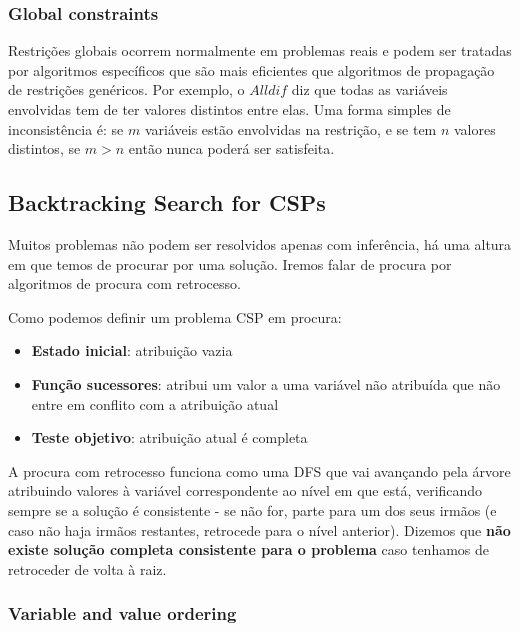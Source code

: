 \documentclass[11pt]{article}
\begin{document}
\subsubsection{Global constraints}

Restrições globais ocorrem normalmente em problemas reais e podem ser tratadas por algoritmos específicos que são mais eficientes que algoritmos de propagação de restrições genéricos. Por exemplo, o $Alldif$ diz que todas as variáveis envolvidas tem de ter valores distintos entre elas. Uma forma simples de inconsistência é: se $m$ variáveis estão envolvidas na restrição, e se tem $n$ valores distintos, se $m > n$ então nunca poderá ser satisfeita.

\subsection{Backtracking Search for CSPs}

Muitos problemas não podem ser resolvidos apenas com inferência, há uma altura em que temos de procurar por uma solução. Iremos falar de procura por algoritmos de procura com retrocesso.\vspace{10pt}

Como podemos definir um problema CSP em procura:
\begin{itemize}[topsep=4pt,itemsep=0pt]
    \item \textbf{Estado inicial}: atribuição vazia
    \item \textbf{Função sucessores}: atribui um valor a uma variável não atribuída que não entre em conflito com a atribuição atual
    \item \textbf{Teste objetivo}: atribuição atual é completa
\end{itemize}\vspace{10pt}

A procura com retrocesso funciona como uma DFS que vai avançando pela árvore atribuindo valores à variável correspondente ao nível em que está, verificando sempre se a solução é consistente - se não for, parte para um dos seus irmãos (e caso não haja irmãos restantes, retrocede para o nível anterior). Dizemos que \textbf{não existe solução completa consistente para o problema} caso tenhamos de retroceder de volta à raiz.

\subsubsection{Variable and value ordering}
\end{document}
